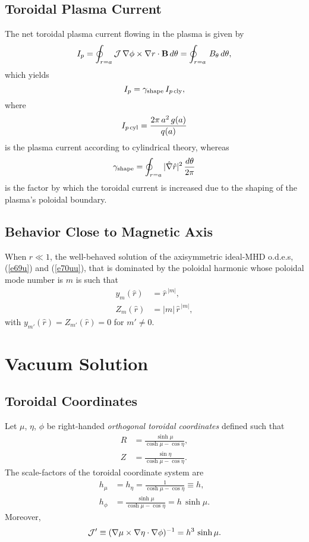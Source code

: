 \documentclass[12pt,prb,aps]{revtex4-1}
\begin{document}
\subsection{Toroidal Plasma Current}
The net toroidal plasma current flowing in the plasma is given by
\begin{equation}\label{ipdef}
I_p = \oint_{r=a}{\cal J}\,\nabla\phi\times\nabla r\cdot{\bf B}\,d\theta = \oint_{r=a}\,B_\theta\,d\theta,
\end{equation}
which yields
\begin{equation}
I_p =\gamma_{\rm shape}\, I_{p\,{\rm cly}},
\end{equation}
where
\begin{equation}
I_{p\,{\rm cyl}} = \frac{2\pi\,a^2\,g(a)}{q(a)}
\end{equation}
is the plasma current according to cylindrical theory, whereas
\begin{equation}
\gamma_{\rm shape} = \oint_{r=a} |\hat{\nabla}\hat{r}|^2\,\frac{d\theta}{2\pi}
\end{equation}
is the factor by which the toroidal  current is increased due to the shaping of the plasma's poloidal
boundary. 

\subsection{Behavior Close to Magnetic Axis}\label{axis}
When $\hat{r}\ll 1$, the well-behaved solution of the axisymmetric ideal-MHD o.d.e.s, (\ref{e69u}) and (\ref{e70uu}), that is dominated by the poloidal harmonic whose poloidal mode number is
$m$ is such that
\begin{align}
y_m(\hat{r}) &= \hat{r}^{\,|m|},\\[0.5ex]
Z_m(\hat{r}) &= |m|\,\hat{r}^{\,|m|},
\end{align}
with $y_{m'}(\hat{r})=Z_{m'}(\hat{r})=0$ for $m'\neq 0$. 

\section{Vacuum Solution}\label{vacuum}
\subsection{Toroidal Coordinates}
Let $\mu$, $\eta$, $\phi$ be right-handed {\em orthogonal toroidal coordinates}\/ defined such that\,\cite{tj,tj1,mf}
\begin{align}
R &= \frac{\sinh\mu}{\cosh\mu-\cos\eta},\\[0.5ex]
Z&=\frac{\sin\eta}{\cosh\mu-\cos\eta}.
\end{align}
The scale-factors of the toroidal coordinate system are
\begin{align}
h_\mu&=h_\eta= \frac{1}{\cosh\mu-\cos\eta}\equiv h,\\[0.5ex]
h_\phi &= \frac{\sinh\mu}{\cosh\mu-\cos\eta} = h\,\sinh\mu.
\end{align}
Moreover, 
\begin{equation}
{\cal J}' \equiv (\nabla\mu\times\nabla\eta\cdot\nabla\phi)^{-1}= h^3\,\sinh\mu.
\end{equation}
\end{document}
